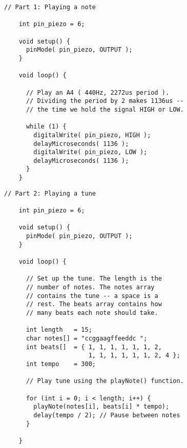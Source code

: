 \begin{minipage}[t]{0.49\tw}
  \vspace{0.1in}
  \begin{Verbatim}[gobble=3,fontsize=\small]
    // Part 1: Playing a note

    int pin_piezo = 6;

    void setup() {
      pinMode( pin_piezo, OUTPUT );
    }

    void loop() {

      // Play an A4 ( 440Hz, 2272us period ).
      // Dividing the period by 2 makes 1136us --
      // the time we hold the signal HIGH or LOW.

      while (1) {
        digitalWrite( pin_piezo, HIGH );
        delayMicroseconds( 1136 );
        digitalWrite( pin_piezo, LOW );
        delayMicroseconds( 1136 );
      }
    }
  \end{Verbatim}
  \vspace{0.1in}
  \begin{Verbatim}[gobble=3,fontsize=\small]
    // Part 2: Playing a tune

    int pin_piezo = 6;

    void setup() {
      pinMode( pin_piezo, OUTPUT );
    }

    void loop() {

      // Set up the tune. The length is the
      // number of notes. The notes array
      // contains the tune -- a space is a
      // rest. The beats array contains how
      // many beats each note should take.

      int length   = 15;
      char notes[] = "ccggaagffeeddc ";
      int beats[]  = { 1, 1, 1, 1, 1, 1, 2,
                       1, 1, 1, 1, 1, 1, 2, 4 };
      int tempo    = 300;

      // Play tune using the playNote() function.

      for (int i = 0; i < length; i++) {
        playNote(notes[i], beats[i] * tempo);
        delay(tempo / 2); // Pause between notes
      }

    }
  \end{Verbatim}
\end{minipage}
\vspace{0.1in}

